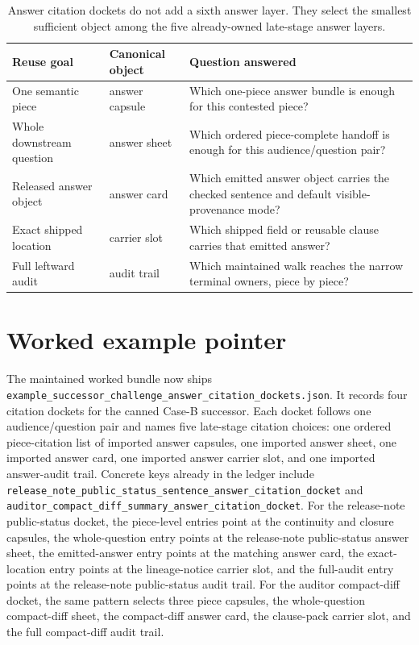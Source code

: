 \documentclass[11pt]{article}
\begin{document}
\begin{table}[t]
\centering
\small
\begin{tabularx}{\linewidth}{@{}l l X@{}}
\toprule
Reuse goal & Canonical object & Question answered \\
\midrule
One semantic piece & answer capsule & Which one-piece answer bundle is enough for this contested piece? \\
Whole downstream question & answer sheet & Which ordered piece-complete handoff is enough for this audience/question pair? \\
Released answer object & answer card & Which emitted answer object carries the checked sentence and default visible-provenance mode? \\
Exact shipped location & carrier slot & Which shipped field or reusable clause carries that emitted answer? \\
Full leftward audit & audit trail & Which maintained walk reaches the narrow terminal owners, piece by piece? \\
\bottomrule
\end{tabularx}
\caption{Answer citation dockets do not add a sixth answer layer. They select the smallest sufficient object among the five already-owned late-stage answer layers.}
\label{tab:answercitationdockets}
\end{table}

\section{Worked example pointer}
The maintained worked bundle now ships \texttt{example\_successor\_challenge\_answer\_citation\_dockets.json}.\cite{series:workedexample}
It records four citation dockets for the canned Case-B successor.
Each docket follows one audience/question pair and names five late-stage citation choices: one ordered piece-citation list of imported answer capsules, one imported answer sheet, one imported answer card, one imported answer carrier slot, and one imported answer-audit trail.
Concrete keys already in the ledger include \texttt{release\_note\_public\_status\_sentence\_answer\_citation\_docket} and \texttt{auditor\_compact\_diff\_summary\_answer\_citation\_docket}.
For the release-note public-status docket, the piece-level entries point at the continuity and closure capsules, the whole-question entry points at the release-note public-status answer sheet, the emitted-answer entry points at the matching answer card, the exact-location entry points at the lineage-notice carrier slot, and the full-audit entry points at the release-note public-status audit trail.
For the auditor compact-diff docket, the same pattern selects three piece capsules, the whole-question compact-diff sheet, the compact-diff answer card, the clause-pack carrier slot, and the full compact-diff audit trail.
\end{document}
